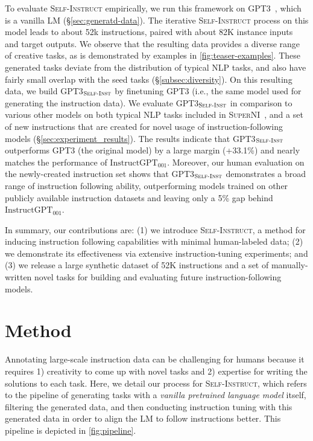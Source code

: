To evaluate \textsc{Self-Instruct} empirically, we run this framework on \textsc{GPT3}~\cite{brown2020gpt3}, which is a vanilla LM (\S\ref{sec:generatd-data}).
The iterative \textsc{Self-Instruct} process on this model leads to about 52k instructions, paired with about 82K instance inputs and target outputs. We observe that the resulting data provides a diverse range of creative tasks, as is demonstrated by examples in \autoref{fig:teaser-examples}. These generated tasks deviate from the distribution of typical NLP tasks, and also have fairly small overlap with the seed tasks (\S\ref{subsec:diversity}).
On this resulting data, we build \textsc{GPT3}$_{\textsc{Self-Inst}}$ by finetuning \textsc{GPT3} (i.e., the same model used for generating the instruction data). We evaluate \textsc{GPT3}$_{\textsc{Self-Inst}}$ in comparison to various other models on both typical NLP tasks included in \textsc{SuperNI}~\cite{wang2022benchmarking}, and a set of new instructions that are created for novel usage of instruction-following models (\S\ref{sec:experiment_results}). 
The results indicate that 
\textsc{GPT3}$_{\textsc{Self-Inst}}$ outperforms \textsc{GPT3} (the original model) by a large margin (+33.1\%) and nearly matches the performance of $\text{InstructGPT}_{\text{001}}$. Moreover, our human evaluation on the newly-created instruction set shows that \textsc{GPT3}$_{\textsc{Self-Inst}}$ demonstrates a broad range of instruction following ability, outperforming models trained on other publicly available instruction datasets and leaving only a 5\% gap behind $\text{InstructGPT}_{\text{001}}$. 

In summary, our contributions are: (1) we introduce \textsc{Self-Instruct}, a method for inducing instruction following capabilities with minimal human-labeled data; (2) we demonstrate its effectiveness via extensive instruction-tuning experiments; and (3) we release a large synthetic dataset of 52K instructions and a set of manually-written novel tasks for building and evaluating future instruction-following models.

\section{Method}
\label{sec:method}

Annotating large-scale instruction data can be challenging for humans because it requires 1) creativity to come up with novel tasks and 2) expertise for writing the solutions to each task. Here, we detail our process for \textsc{Self-Instruct}, which refers to the pipeline of generating tasks with a \textit{vanilla pretrained language model} itself, filtering the generated data, and then conducting instruction tuning with this generated data in order to align the LM to follow instructions better. This pipeline is depicted in \autoref{fig:pipeline}. 

